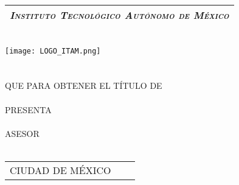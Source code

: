\thispagestyle{empty}
\begin{titlepage}

	\begin{center}
	\vspace{70pt}
		\begin{tabular}{c}
			\Large \emph{\textsc{Instituto Tecnológico Autónomo de México}}\\
			\hline
		\end{tabular}\\
		\vspace{25pt}
		\texttt{[image: LOGO\_ITAM.png]}\\
		\vspace{25pt}
		{\huge \thetitle}\\
		\vspace{5pt}
		\vspace{20 pt}
		{\Large \thethesis } \\
		\vspace{5pt}
		QUE PARA OBTENER EL TÍTULO DE \\
		\vspace{5pt}
		{\Large \thedegree} \\
		\vspace{5pt}
		PRESENTA \\
		\vspace{5pt}
		{\Large \theauthor} \\
		\vfill
		ASESOR \\
		{\Large \theadvisor} \\
		\vspace{5pt}
		\begin{tabular}{lcr}
			CIUDAD DE MÉXICO & \hspace{60pt} & \theyear
		\end{tabular}
	\end{center}
\end{titlepage}
